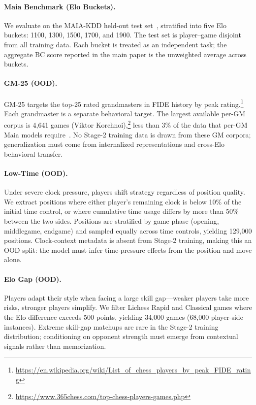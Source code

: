 \paragraph{Maia Benchmark (Elo Buckets).}
\label{sec:app_bench_bc_maia}
We evaluate on the MAIA-KDD held-out test set~\citep{mcilroy2020aligning}, stratified into five Elo buckets: 1100, 1300, 1500, 1700, and 1900. The test set is player--game disjoint from all training data. Each bucket is treated as an independent task; the aggregate BC score reported in the main paper is the unweighted average across buckets.

\paragraph{GM-25 (OOD).}
\label{sec:app_bench_bc_gm}
GM-25 targets the top-25 rated grandmasters in FIDE history by peak rating.\footnote{\url{https://en.wikipedia.org/wiki/List_of_chess_players_by_peak_FIDE_rating}} Each grandmaster is a separate behavioral target. The largest available per-GM corpus is 4,641 games (Viktor Korchnoi),\footnote{\url{https://www.365chess.com/top-chess-players-games.php}} less than 3\% of the data that per-GM Maia models require~\citep{mcilroy2020aligning}. No Stage-2 training data is drawn from these GM corpora; generalization must come from internalized representations and cross-Elo behavioral transfer.

\paragraph{Low-Time (OOD).}
\label{sec:app_bench_bc_time}
Under severe clock pressure, players shift strategy regardless of position quality. We extract positions where either player's remaining clock is below 10\% of the initial time control, or where cumulative time usage differs by more than 50\% between the two sides. Positions are stratified by game phase (opening, middlegame, endgame) and sampled equally across time controls, yielding 129,000 positions. Clock-context metadata is absent from Stage-2 training, making this an OOD split: the model must infer time-pressure effects from the position and move alone.

\paragraph{Elo Gap (OOD).}
\label{sec:app_bench_bc_elo}
Players adapt their style when facing a large skill gap---weaker players take more risks, stronger players simplify. We filter Lichess Rapid and Classical games where the Elo difference exceeds 500 points, yielding 34,000 games (68,000 player-side instances). Extreme skill-gap matchups are rare in the Stage-2 training distribution; conditioning on opponent strength must emerge from contextual signals rather than memorization.

